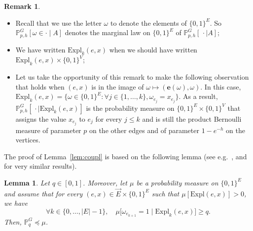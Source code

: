 \documentclass[10pt]{amsart}
\newtheorem{lemm}[theo]{Lemma}\newtheorem{prop}[theo]{Proposition}\newtheorem{coro}[theo]{Corollary}\newtheorem{conj}[theo]{Conjecture}
\theoremstyle{definition}\newtheorem{defi}[theo]{Definition}\newtheorem{rema}[theo]{Remark}\newtheorem{exam}[theo]{Example}\newtheorem{exem}[theo]{Example}\newtheorem{nota}[theo]{Notation}
\newcommand{\Pro}{\mathbb{P}}
\newcommand{\ee}{\mathbf{e}}
\newcommand{\Expl}{\mathrm{Expl}}
\let\oldforall\forall
\renewcommand*{\forall}{\mathrel{\oldforall}}
\begin{document}
\begin{rema}\label{rk:formal}\leavevmode
\begin{itemize}
\item Recall that we use the letter $\omega$ to denote the elements of $\{0,1\}^E$. So $\Pro_{p,h}^G [\omega \in \cdot \mid A]$ denotes the marginal law on $\{0,1\}^E$ of $\Pro_{p,h}^G[\, \cdot \mid A]$;
\item We have written $\Expl_k(e,x)$ when we should have written $\Expl_k(e,x) \times \{0,1\}^V$;
\item Let us take the opportunity of this remark to make the following observation that holds when $(e,x)$ is in the image of $\omega \mapsto (\ee(\omega),\omega)$. In this case, $\Expl_k(e,x)=\{\omega \in \{0,1\}^E : \forall j \in \{1,\dots,k\}, \omega_{e_j}=x_{e_j}\}$. As a result, $\Pro_{p,h}^G [\, \cdot \mid \Expl_k(e,x)]$ is the probability measure on $\{0,1\}^E\times\{0,1\}^V$ that assigns the value $x_{e_j}$ to $e_j$ for every $j \le k$ and is still the product Bernoulli measure of parameter $p$ on the other edges and of parameter $1-e^{-h}$ on the vertices.
\end{itemize}
\end{rema}

The proof of Lemma~\ref{lem:coupl} is based on the following lemma (see e.g.~\cite[Lemma~1]{Rus82}, \cite[(7.64)]{Gri99} and~\cite[Lemma~2.1]{DRT19} for very similar results).

\begin{lemm}\label{lem:gen}
Let $q \in [0,1]$. Moreover, let $\mu$ be a probability measure on $\{0,1\}^E$ and assume that for every $(e,x) \in \vec{E}\times\{0,1\}^E$ such that $\mu[\Expl(e,x)]>0$, we have
\[
\forall k \in \{0,\dots,|E|-1\}, \quad \mu \big[\omega_{e_{k+1}} = 1 \; \big| \; \Expl_k(e,x) \big] \ge q.
\]
Then, $\Pro_q^G \preceq \mu$.
\end{lemm}
\end{document}
